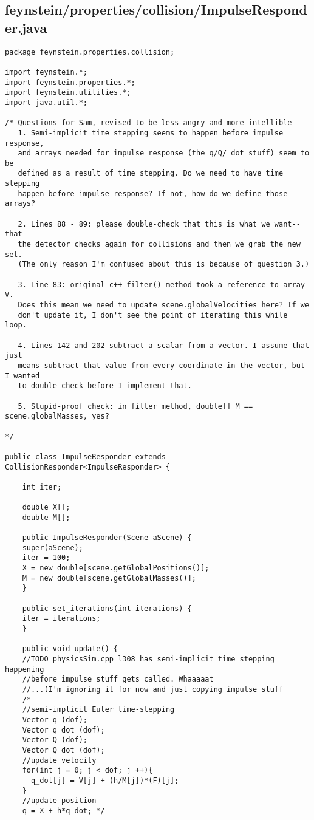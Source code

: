 \subsection*{feynstein/properties/collision/ImpulseResponder.java}
\begin{lstlisting}
package feynstein.properties.collision;

import feynstein.*;
import feynstein.properties.*;
import feynstein.utilities.*;
import java.util.*;

/* Questions for Sam, revised to be less angry and more intellible
   1. Semi-implicit time stepping seems to happen before impulse response,
   and arrays needed for impulse response (the q/Q/_dot stuff) seem to be
   defined as a result of time stepping. Do we need to have time stepping 
   happen before impulse response? If not, how do we define those arrays?
   
   2. Lines 88 - 89: please double-check that this is what we want--that
   the detector checks again for collisions and then we grab the new set.
   (The only reason I'm confused about this is because of question 3.)

   3. Line 83: original c++ filter() method took a reference to array V. 
   Does this mean we need to update scene.globalVelocities here? If we 
   don't update it, I don't see the point of iterating this while loop.

   4. Lines 142 and 202 subtract a scalar from a vector. I assume that just
   means subtract that value from every coordinate in the vector, but I wanted
   to double-check before I implement that.

   5. Stupid-proof check: in filter method, double[] M == scene.globalMasses, yes?

*/

public class ImpulseResponder extends CollisionResponder<ImpulseResponder> {

    int iter;

    double X[];
    double M[];

    public ImpulseResponder(Scene aScene) {
	super(aScene);
	iter = 100;
	X = new double[scene.getGlobalPositions()];
	M = new double[scene.getGlobalMasses()];
    }

    public set_iterations(int iterations) {
	iter = iterations;
    }
    
    public void update() {
	//TODO physicsSim.cpp l308 has semi-implicit time stepping happening
	//before impulse stuff gets called. Whaaaaat
	//...(I'm ignoring it for now and just copying impulse stuff
	/*
	//semi-implicit Euler time-stepping
	Vector q (dof);
	Vector q_dot (dof);
	Vector Q (dof);
	Vector Q_dot (dof);
	//update velocity
	for(int j = 0; j < dof; j ++){
	  q_dot[j] = V[j] + (h/M[j])*(F)[j];
	}
	//update position
	q = X + h*q_dot; */


\end{lstlisting}
